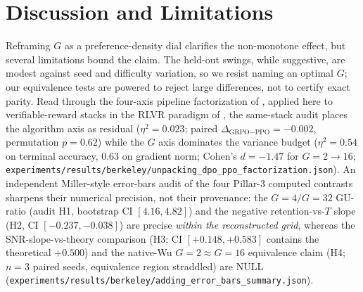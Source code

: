 \documentclass{article}
\begin{document}
 \section{Discussion and Limitations}
\label{sec:p3-discussion}
Reframing $G$ as a preference-density dial clarifies the non-monotone effect, but
several limitations bound the claim. The held-out swings, while suggestive, are
modest against seed and difficulty variation, so we resist naming an optimal $G$;
our equivalence tests are powered to reject large differences, not to certify exact
parity. Read through the four-axis pipeline factorization of
\citet{ivison2024unpacking}, applied here to verifiable-reward stacks in the
RLVR paradigm of \citet{lambert2024tulu3}, the same-stack audit places the
algorithm axis as residual ($\eta^2{=}0.023$; paired
$\Delta_{\text{GRPO}-\text{PPO}}{=}-0.002$, permutation $p{=}0.62$) while the
$G$ axis dominates the variance budget ($\eta^2{=}0.54$ on terminal accuracy,
$0.63$ on gradient norm; Cohen's $d{=}-1.47$ for $G{=}2{\to}16$;
\texttt{experiments/results/berkeley/unpacking\_dpo\_ppo\_factorization.json}).
An independent Miller-style error-bars audit \citep{miller2024erroreval} of the
four Pillar-3 computed contrasts sharpens their numerical precision, not their
provenance: the $G{=}4/G{=}32$ GU-ratio (audit H1, bootstrap CI
$[4.16, 4.82]$) and the negative retention-vs-$T$ slope (H2, CI
$[-0.237, -0.038]$) are precise \emph{within the reconstructed grid},
whereas the SNR-slope-vs-theory comparison (H3; CI $[+0.148, +0.583]$
contains the theoretical $+0.500$) and the native-Wu $G{=}2 \approx G{=}16$
equivalence claim (H4; $n{=}3$ paired seeds, equivalence region straddled)
are NULL
(\texttt{experiments/results/berkeley/adding\_error\_bars\_summary.json}).
\end{document}
